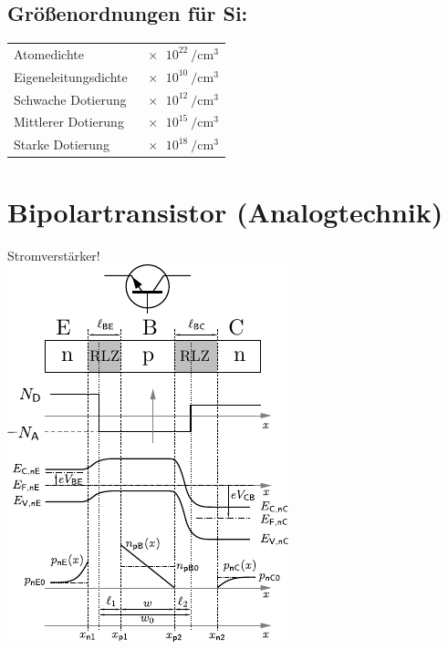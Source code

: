 \documentclass[fs, footer]{latex4ei}
\begin{document}
\begin{multicols*}{4}
{	\subsection{Größenordnungen für Si:}
	\begin{tabular}{ll}
		Atomedichte & $\SI{e22}{\per\centi\meter^3}$\\
		Eigeneleitungsdichte & $\SI{e10}{\per\centi\meter^3}$\\
		Schwache Dotierung & $\SI{e12}{\per\centi\meter^3}$\\
		Mittlerer Dotierung & $\SI{e15}{\per\centi\meter^3}$\\
		Starke Dotierung & $\SI{e18}{\per\centi\meter^3}$\\
	\end{tabular}	
}





\section{Bipolartransistor (Analogtechnik)}
Stromverstärker!\\

\includegraphics{./img/bipolartransistor.pdf}




\end{multicols*}
\end{document}

